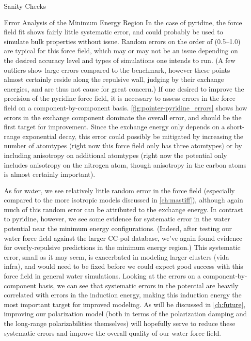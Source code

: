 \begin{subsection}{Sanity Checks}
\begin{paragraph}{Error Analysis of the Minimum Energy Region}
In the case of pyridine, the force field fit shows fairly little systematic
error, and could probably be used to simulate bulk properties without issue.
Random errors on the order of \kjmol(0.5--1.0) are typical for this force
field, which may or may not be an issue depending on the desired accuracy
level and types of simulations one intends to run. 
(A few outliers show large errors compared to the
\sapt benchmark, however these points almost certainly reside along the
repulsive wall, judging by their exchange energies, and are thus not cause for
great concern.)
If one desired to improve
the precision of the pyridine force field, it is necessary to assess errors in
the force field on a component-by-component basis. \cref{fig:pointer-pyridine_errors}
shows how errors in the exchange component dominate the overall
error, and should be the first target for improvement. Since the exchange energy
only depends on a short-range exponential decay, this error could possibly be
mitigated by increasing the number of atomtypes (right now this force field
only has three atomtypes) or by including anisotropy on additional atomtypes
(right now the potential only includes anisotropy on the nitrogen atom, though
anisotropy in the carbon atoms is almost certainly important).

As for water, we see relatively little random error in the force field
(especially compared to the more isotropic models discussed in
\cref{ch:mastiff}), although again much of this random error can be attributed
to the exchange energy. In contrast to pyridine, however, we see some evidence
for systematic error in the water potential near the minimum energy
configurations. (Indeed, after testing our water force field against the
larger CC-pol database,\cite{Babin2013} we've again found evidence for
overly-repulsive predictions in the minimum energy region.) This systematic
error, small as it may seem, is exacerbated in modeling larger clusters (vida
infra), and would need to be fixed before we could expect good success with
this force field in general water simulations. Looking at the errors on a
component-by-component basis, we can see that systematic errors in the potential
are heavily correlated with errors in the induction energy, making this
induction energy the most important target for improved modeling. As will be
discussed in \cref{ch:future}, improving our polarization model (both in terms
of the polarization damping and the long-range polarizabilities themselves)
will hopefully serve to reduce these systematic errors and improve the overall
quality of our water force field.


\end{paragraph}
\end{subsection}
